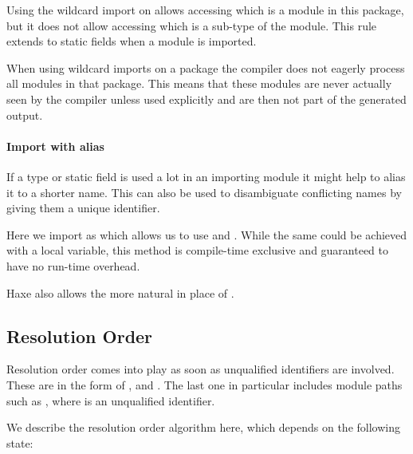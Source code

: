 
Using the wildcard import on  allows accessing  which is a module in this package, but it does not allow accessing  which is a sub-type of the  module. This rule extends to static fields when a module is imported.

When using wildcard imports on a package the compiler does not eagerly process all modules in that package. This means that these modules are never actually seen by the compiler unless used explicitly and are then not part of the generated output.

\paragraph{Import with alias}

If a type or static field is used a lot in an importing module it might help to alias it to a shorter name. This can also be used to disambiguate conflicting names by giving them a unique identifier.


Here we import  as  which allows us to use  and . While the same could be achieved with a local variable, this method is compile-time exclusive and guaranteed to have no run-time overhead.


Haxe also allows the more natural  in place of .


\subsection{Resolution Order}
\label{type-system-resolution-order}

Resolution order comes into play as soon as unqualified identifiers are involved. These are  in the form of ,  and . The last one in particular includes module paths such as , where  is an unqualified identifier.  

We describe the resolution order algorithm here, which depends on the following state:


